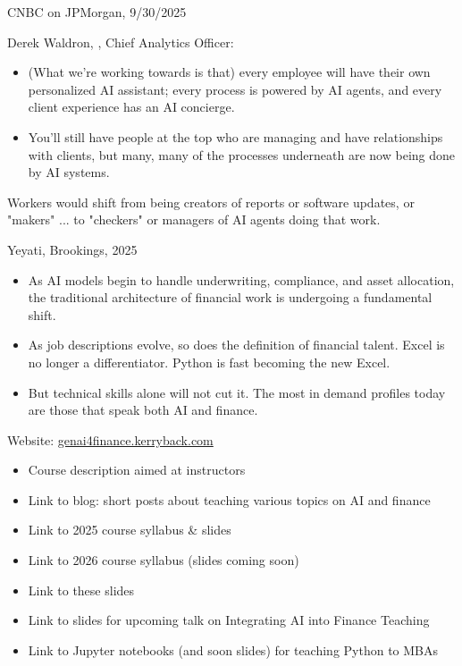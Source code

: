 \documentclass{beamer}
\begin{document}
\begin{frame}{CNBC on JPMorgan, 9/30/2025}

Derek Waldron, , Chief Analytics Officer:
\begin{itemize}
\item (What we're working towards is that) every employee will have their own personalized AI assistant; every process is powered by AI agents, and every client experience has an AI concierge.
\item You'll still have people at the top who are managing and have relationships with clients, but many, many of the processes underneath are now being done by AI systems.
\end{itemize}


Workers would shift from being creators of reports or software updates, or "makers" ... to "checkers" or managers of AI agents doing that work.

\end{frame}

\begin{frame}{Yeyati, Brookings, 2025}

\begin{itemize}
\item As AI models begin to handle underwriting, compliance, and asset allocation, the traditional architecture of financial work is undergoing a fundamental shift.
\item As job descriptions evolve, so does the definition of financial talent. Excel is no longer a differentiator. Python is fast becoming the new Excel. 
\item But technical skills alone will not cut it. The most in demand profiles today are those that speak both AI and finance.
\end{itemize}
\end{frame}

\begin{frame}{Website: \href{https://genai4finance.kerryback.com}{genai4finance.kerryback.com}}
\begin{itemize}
\item Course description aimed at instructors
\item Link to blog: short posts about teaching various topics on AI and finance 
\item Link to 2025 course syllabus \& slides
\item Link to 2026 course syllabus (slides coming soon)
\item Link to these slides
\item Link to slides for upcoming talk on Integrating AI into Finance Teaching
\item Link to Jupyter notebooks (and soon slides) for teaching Python to MBAs
\end{itemize}
\end{frame} 
\end{document}
